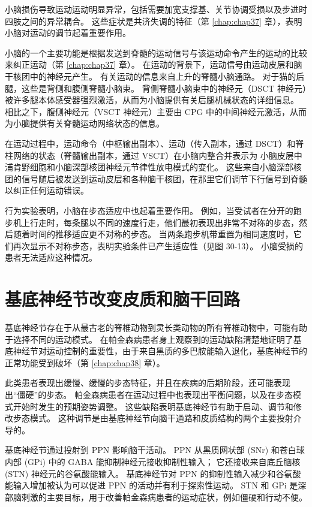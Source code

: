 小脑损伤导致运动运动明显异常，包括需要加宽支撑基、关节协调受损以及步进时四肢之间的异常耦合。
这些症状是共济失调的特征（第 \ref{chap:chap37} 章），表明小脑对运动的调节起着重要作用。


小脑的一个主要功能是根据发送到脊髓的运动信号与该运动命令产生的运动的比较来纠正运动（第 \ref{chap:chap37} 章）。
在运动的背景下，运动信号由运动皮层和脑干核团中的神经元产生。
有关运动的信息来自上升的脊髓小脑通路。
对于猫的后腿，这些是背侧和腹侧脊髓小脑束。
背侧脊髓小脑束中的神经元（DSCT 神经元）被许多腿本体感受器强烈激活，从而为小脑提供有关后腿机械状态的详细信息。
相比之下，腹侧神经元（VSCT 神经元）主要由 CPG 中的中间神经元激活，从而为小脑提供有关脊髓运动网络状态的信息。


在运动过程中，运动命令（中枢输出副本）、运动（传入副本，通过 DSCT）和脊柱网络的状态（脊髓输出副本，通过 VSCT）在小脑内整合并表示为 小脑皮层中浦肯野细胞和小脑深部核团神经元节律性放电模式的变化。
这些来自小脑深部核团的信号随后被发送到运动皮层和各种脑干核团，在那里它们调节下行信号到脊髓以纠正任何运动错误。


行为实验表明，小脑在步态适应中也起着重要作用。
例如，当受试者在分开的跑步机上行走时，每条腿以不同的速度行走，他们最初表现出非常不对称的步态，然后随着时间的推移适应更不对称的步态。
当两条跑步机带重置为相同速度时，它们再次显示不对称步态，表明实验条件已产生适应性（见图 30-13）。
小脑受损的患者无法适应这种情况。


\section{基底神经节改变皮质和脑干回路}

基底神经节存在于从最古老的脊椎动物到灵长类动物的所有脊椎动物中，可能有助于选择不同的运动模式。
在帕金森病患者身上观察到的运动缺陷清楚地证明了基底神经节对运动控制的重要性，由于来自黑质的多巴胺能输入退化，基底神经节的正常功能受到破坏（第 \ref{chap:chap38} 章）。


此类患者表现出缓慢、缓慢的步态特征，并且在疾病的后期阶段，还可能表现出“僵硬”的步态。
帕金森病患者在运动过程中也表现出平衡问题，以及在步态模式开始时发生的预期姿势调整。
这些缺陷表明基底神经节有助于启动、调节和修改步态模式。
这种调节是由基底神经节向脑干通路和皮质结构的两个主要投射介导的。


基底神经节通过投射到 PPN 影响脑干活动。
PPN 从黑质网状部 (SNr) 和苍白球内部 (GPi) 中的 GABA 能抑制神经元接收抑制性输入；
它还接收来自底丘脑核 (STN) 神经元的谷氨酸能输入。
基底神经节对 PPN 的抑制性输入减少和谷氨酸能输入增加被认为可以促进 PPN 的活动并有利于探索性运动。
STN 和 GPi 是深部脑刺激的主要目标，用于改善帕金森病患者的运动症状，例如僵硬和行动不便。


